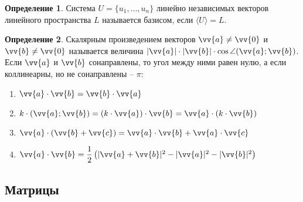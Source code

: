 \documentclass[12pt]{article}
\theoremstyle{definition}
\newtheorem{definition}{Определение}
\begin{document}
\begin{definition}
    Система $U=\{u_1,\ldots,u_n\}$ линейно независимых векторов линейного пространства $L$ называется базисом, если $\langle U \rangle=L$.
\end{definition}
\begin{definition}
    Скалярным произведением векторов $\vv{a}\neq\vv{0}$ и $\vv{b}\neq\vv{0}$ называется величина $|\vv{a}|\cdot|\vv{b}|\cdot\cos\angle(\vv{a};\vv{b})$. Если $\vv{a}$ и $\vv{b}$ сонаправлены, то угол между ними равен нулю, а если коллинеарны, но не сонаправлены – $\pi$:
    \begin{center}
        \begin{multicols}{2}
            \begin{enumerate}
                \item $\vv{a}\cdot\vv{b}=\vv{b}\cdot\vv{a}$\\
                \item $k\cdot(\vv{a};\vv{b})=(k\cdot\vv{a})\cdot\vv{b}=\vv{a}\cdot(k\cdot\vv{b})$\\
                \item $\vv{a}\cdot(\vv{b}+\vv{c})=\vv{a}\cdot\vv{b}+\vv{a}\cdot\vv{c}$\\
                \item $\vv{a}\cdot\vv{b}=\dfrac{1}{2}\left(|\vv{a}+\vv{b}|^2-|\vv{a}|^2-|\vv{b}|^2\right)$
            \end{enumerate}
        \end{multicols}
    \end{center}
\end{definition}

\subsection{Матрицы}
\end{document}
